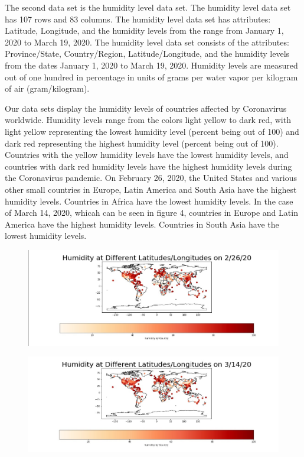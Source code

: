 \documentclass[10pt,journal,compsoc]{IEEEtran}
\begin{document}
{{	The second data set is the humidity level data set. \cite{eeemonts-2020} The humidity level data set has 107 rows and 83 columns. The humidity level data set has attributes: Latitude, Longitude, and the humidity levels from the range from January 1, 2020 to March 19, 2020. The humidity level data set consists of the attributes: Province/State, Country/Region, Latitude/Longitude, and the humidity levels from the dates January 1, 2020 to March 19, 2020. Humidity levels are measured out of one hundred in percentage in units of grams per water vapor per kilogram of air (gram/kilogram).

	Our data sets display the humidity levels of countries affected by Coronavirus worldwide. Humidity levels range from the colors light yellow to dark red, with light yellow representing the lowest humidity level (percent being out of 100) and dark red representing the highest humidity level (percent being out of 100). Countries with the yellow humidity levels have the lowest humidity levels, and countries with dark red humidity levels have the highest humidity levels during the Coronavirus pandemic. On February 26, 2020, the United States and various other small countries in Europe, Latin America and South Asia have the highest humidity levels. Countries in Africa have the lowest humidity levels. In the case of March 14, 2020, whicah can be seen in figure 4, countries in Europe and Latin America have the highest humidity levels. Countries in South Asia have the lowest humidity levels.

\begin{figure}[!htbp] %
	\includegraphics[scale=0.3]{humidity-feb-26.png}\\
	\centering
	\label{LP-COVID-Humidity February 26th}
\end{figure}

\begin{figure}[!htbp] %
	\includegraphics[scale=0.3]{humidity-mar-14.png}\\
	\centering
	\label{LP-COVID-Humidity March 14th}
\end{figure}

}}
\end{document}
